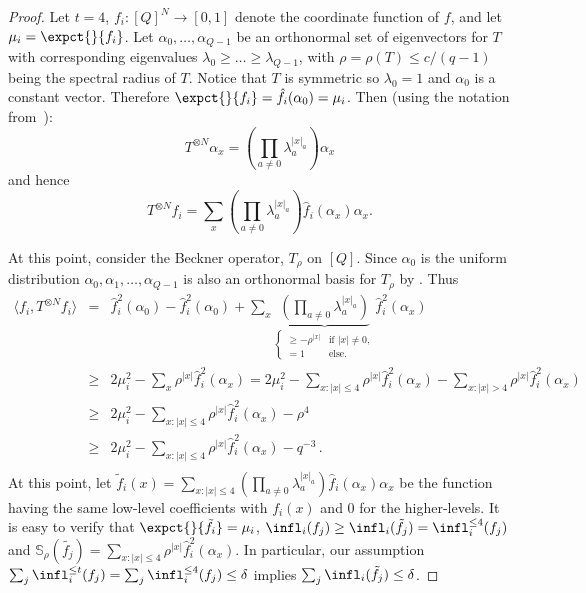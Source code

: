 \begin{proof}
  Let $t=4$, $f_i:[Q]^N\rightarrow[0,1]$ denote the 
  coordinate function of $f$, and let $\mu_i = \expct{}{f_i}$. Let
  $\alpha_0,\ldots, \alpha_{Q-1}$ be an orthonormal set of
  eigenvectors for $T$ with corresponding eigenvalues ${\lambda_0\ge
    \ldots\ge \lambda_{Q-1}}$, with $\rho=\rho(T)\le {c}/{(q-1)}$
  being the spectral radius of $T$. Notice that $T$ is symmetric so
  $\lambda_0 = 1$ and $\alpha_0$ is a constant vector. Therefore
  $\expct{}{f_i} = \hat{f}_i(\alpha_0) = \mu_i$. Then (using the
  notation from~\cite{DMR}):
  \[ T^{\otimes N} \alpha_x = (\prod_{a \neq 0} \lambda_a ^{|x|_a}) \alpha_x \]
  and hence
  \[ T^{\otimes N} f_i = \sum_x (\prod_{a \neq 0} \lambda_a ^{|x|_a})
  \hat{f}_i(\alpha_x) \alpha_x. \]


  At this point, consider the Beckner operator, $T_{\rho}$ on
  $[Q]$. Since $\alpha_0$ is the uniform distribution 
  $\alpha_0,\alpha_1,\ldots,\alpha_{Q-1}$ is
  also an orthonormal basis for $T_{\rho}$ by . 
  Thus
  \begin{eqnarray*}
    \langle f_i, T^{\otimes N} f_i\rangle &=& 
    \hat{f}_i^2(\alpha_0) - \hat{f}_i^2(\alpha_0) + 
    \sum_x \underbrace{(\prod_{a \neq 0} \lambda_a ^{|x|_a})}_
    {
      \begin{cases}
        \ge - \rho^{|x|} & \text{if }|x|\neq 0,  \\
        = 1 & \text{else.}
      \end{cases}
    }
    \hat{f}_i^2(\alpha_x)\\
    &\ge& 2 \mu_i^2 - 
    \sum_{x} \rho^{|x|} \hat{f}_i^2(\alpha_x) =
    2\mu_i^2 -\sum_{x:|x|\le 4} \rho^{|x|} \hat{f}_i^2(\alpha_x) 
    -\sum_{x:|x|> 4} \rho^{|x|} \hat{f}_i^2(\alpha_x)\\
    &\ge& 2\mu_i^2 
    -\sum_{x:|x|\le 4} \rho^{|x|} \hat{f}_i^2(\alpha_x) 
    - \rho^{4}\\
    &\ge&  2\mu_i^2 
    -\sum_{x:|x|\le 4} \rho^{|x|} \hat{f}_i^2(\alpha_x) 
    - q^{-3}\,.\\
  \end{eqnarray*}
  At this point, let $\tilde{f}_i(x) = \sum_{x:|x|\le 4} (\prod_{a
    \neq 0} \lambda_a ^{|x|_a}) \hat{f}_i(\alpha_x)\alpha_x $ be the
  function having the same low-level coefficients with $f_i(x)$ and
  $0$ for the higher-levels. It is easy to verify that
  $\expct{}{\tilde{f}_i} = \mu_i$, $\infl_i(f_j) \ge
  \infl_i(\tilde{f}_j) = \infl_i^{\le 4}(f_j)$ and
  $\mathbb{S}_{\rho}(\tilde{f_j}) = \sum_{x:|x|\le 4} \rho^{|x|}
  \hat{f}_i^2(\alpha_x)$. In particular, our assumption $\sum_j
  \infl_i^{\le t}(f_j)=\sum_j \infl_i^{\le 4}(f_j) \le \delta$ implies
  $\sum_j \infl_i(\tilde{f}_j) \le \delta$.


\end{proof}
